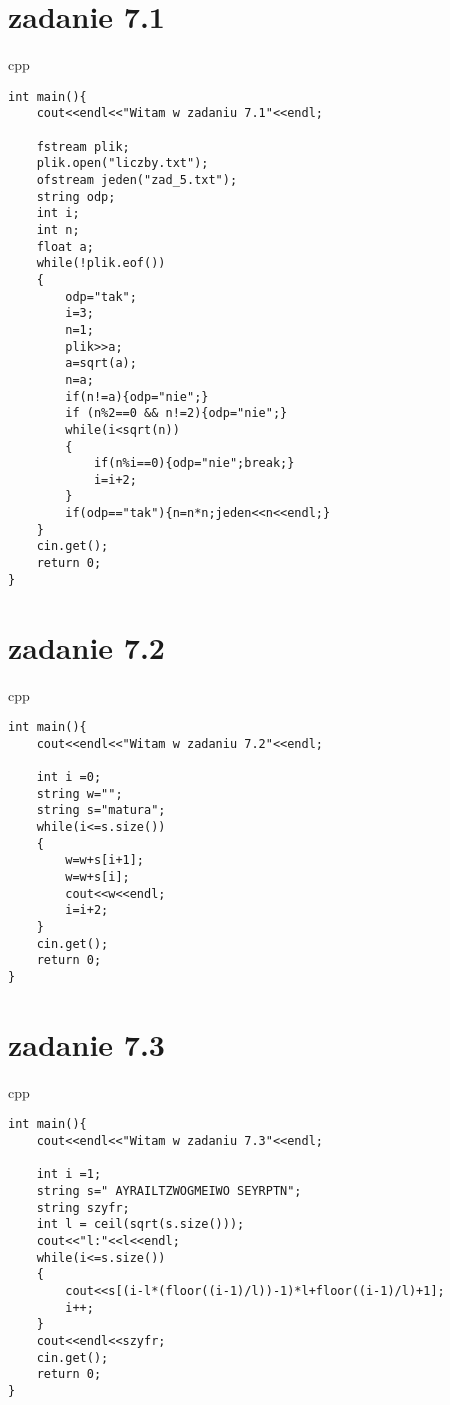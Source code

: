 \documentclass{article}
\begin{document}
\section*{zadanie 7.1}

\begin{temp}{\large cpp}  
\begin{lstlisting}
int main(){
	cout<<endl<<"Witam w zadaniu 7.1"<<endl;
	
	fstream plik;
	plik.open("liczby.txt");
	ofstream jeden("zad_5.txt");
	string odp;
	int i;
	int n;
	float a;
	while(!plik.eof())
	{
		odp="tak";
        i=3;
        n=1;
        plik>>a;
        a=sqrt(a);
        n=a;
        if(n!=a){odp="nie";}
        if (n%2==0 && n!=2){odp="nie";}
        while(i<sqrt(n))
        {
            if(n%i==0){odp="nie";break;}
            i=i+2;
        }
		if(odp=="tak"){n=n*n;jeden<<n<<endl;}	
	}
	cin.get();
	return 0;
}   

\end{lstlisting}
\end{temp}

\section*{zadanie 7.2}

\begin{temp}{\large cpp}  
\begin{lstlisting}
int main(){
	cout<<endl<<"Witam w zadaniu 7.2"<<endl;
	
	int i =0;
	string w="";
	string s="matura";
	while(i<=s.size())
	{
		w=w+s[i+1];
		w=w+s[i];
		cout<<w<<endl;
		i=i+2;
	}
	cin.get();
	return 0;
}   

\end{lstlisting}
\end{temp}

\section*{zadanie 7.3}

\begin{temp}{\large cpp}  
\begin{lstlisting}
int main(){
	cout<<endl<<"Witam w zadaniu 7.3"<<endl;
	
	int i =1;
	string s=" AYRAILTZWOGMEIWO SEYRPTN";
	string szyfr;
	int l = ceil(sqrt(s.size()));
	cout<<"l:"<<l<<endl;
	while(i<=s.size())
	{
		cout<<s[(i-l*(floor((i-1)/l))-1)*l+floor((i-1)/l)+1];
		i++;
	}
	cout<<endl<<szyfr;
	cin.get();
	return 0;
}   

\end{lstlisting}
\end{temp}
\end{document}
